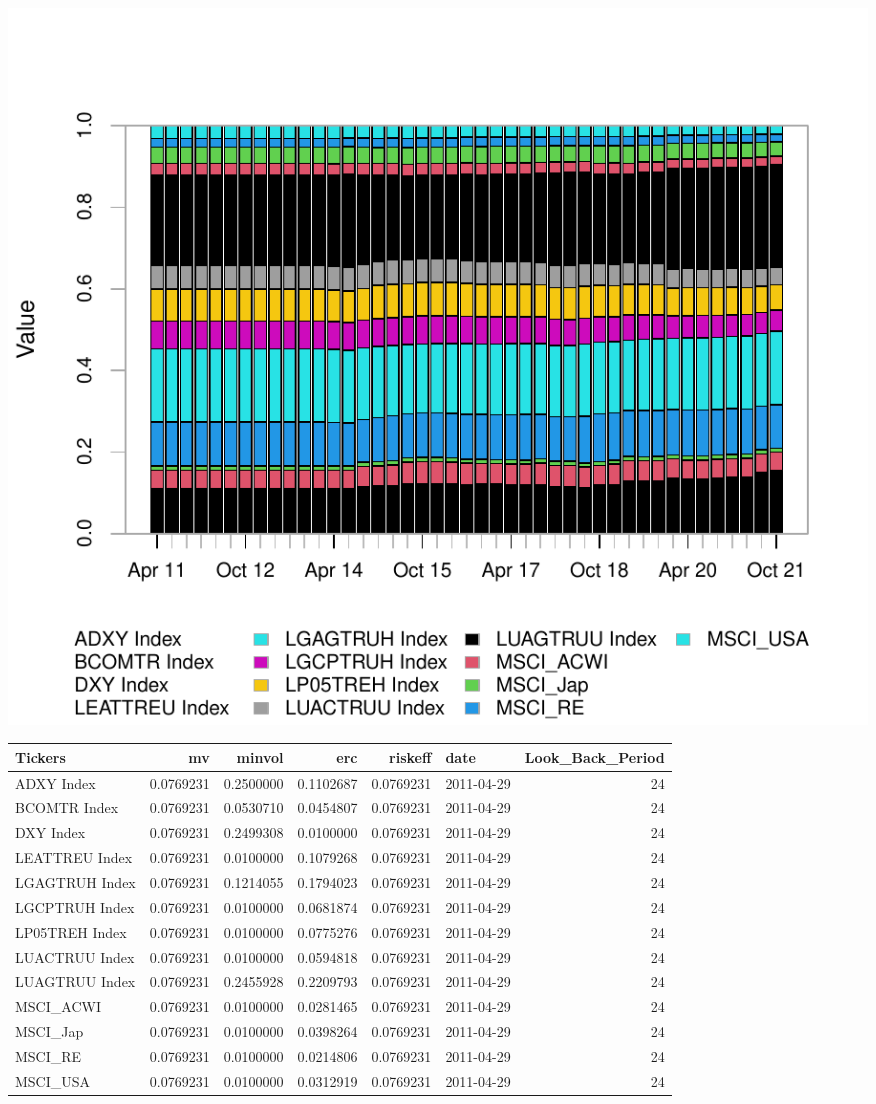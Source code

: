 \documentclass[12pt,preprint, authoryear]{elsarticle}
\numberwithin{equation}{section}
\numberwithin{figure}{section}
\numberwithin{table}{section}
\begin{document}
\includegraphics{Question-6_files/figure-latex/unnamed-chunk-5-1.pdf}

\begin{tabular}{l|r|r|r|r|l|r}
\hline
Tickers & mv & minvol & erc & riskeff & date & Look\_Back\_Period\\
\hline
ADXY Index & 0.0769231 & 0.2500000 & 0.1102687 & 0.0769231 & 2011-04-29 & 24\\
\hline
BCOMTR Index & 0.0769231 & 0.0530710 & 0.0454807 & 0.0769231 & 2011-04-29 & 24\\
\hline
DXY Index & 0.0769231 & 0.2499308 & 0.0100000 & 0.0769231 & 2011-04-29 & 24\\
\hline
LEATTREU Index & 0.0769231 & 0.0100000 & 0.1079268 & 0.0769231 & 2011-04-29 & 24\\
\hline
LGAGTRUH Index & 0.0769231 & 0.1214055 & 0.1794023 & 0.0769231 & 2011-04-29 & 24\\
\hline
LGCPTRUH Index & 0.0769231 & 0.0100000 & 0.0681874 & 0.0769231 & 2011-04-29 & 24\\
\hline
LP05TREH Index & 0.0769231 & 0.0100000 & 0.0775276 & 0.0769231 & 2011-04-29 & 24\\
\hline
LUACTRUU Index & 0.0769231 & 0.0100000 & 0.0594818 & 0.0769231 & 2011-04-29 & 24\\
\hline
LUAGTRUU Index & 0.0769231 & 0.2455928 & 0.2209793 & 0.0769231 & 2011-04-29 & 24\\
\hline
MSCI\_ACWI & 0.0769231 & 0.0100000 & 0.0281465 & 0.0769231 & 2011-04-29 & 24\\
\hline
MSCI\_Jap & 0.0769231 & 0.0100000 & 0.0398264 & 0.0769231 & 2011-04-29 & 24\\
\hline
MSCI\_RE & 0.0769231 & 0.0100000 & 0.0214806 & 0.0769231 & 2011-04-29 & 24\\
\hline
MSCI\_USA & 0.0769231 & 0.0100000 & 0.0312919 & 0.0769231 & 2011-04-29 & 24\\
\hline
\end{tabular}
\end{document}

